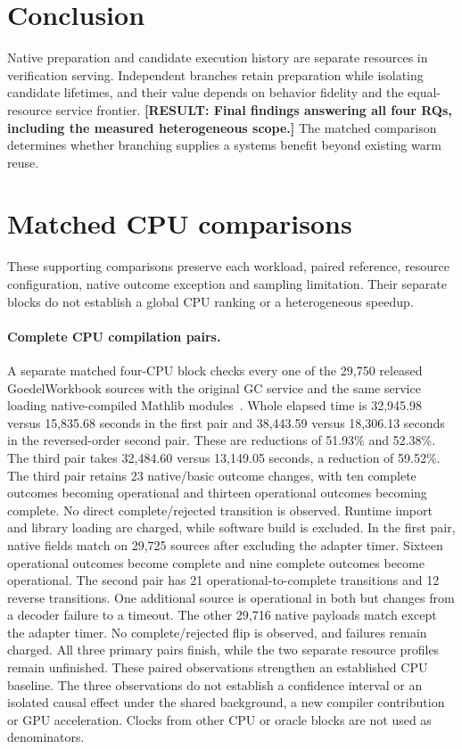 \documentclass[10pt,twocolumn]{article}
\newcommand{\missing}[1]{\textbf{[RESULT: #1]}}
\begin{document}
\section{Conclusion}
Native preparation and candidate execution history are separate resources in verification serving. Independent branches retain preparation while isolating candidate lifetimes, and their value depends on behavior fidelity and the equal-resource service frontier. \missing{Final findings answering all four RQs, including the measured heterogeneous scope.} The matched comparison determines whether branching supplies a systems benefit beyond existing warm reuse.




\appendix
\section{Matched CPU comparisons}\label{app:cpu-controls}
These supporting comparisons preserve each workload, paired reference, resource
configuration, native outcome exception and sampling limitation. Their separate
blocks do not establish a global CPU ranking or a heterogeneous speedup.

\paragraph{Complete CPU compilation pairs.}
A separate matched four-CPU block checks every one of the 29,750 released
GoedelWorkbook sources with the original GC service and the same service
loading native-compiled Mathlib modules~\cite{lean4}.
Whole elapsed time is 32,945.98 versus 15,835.68 seconds in the first pair
and 38,443.59 versus 18,306.13 seconds in the reversed-order second pair.
These are reductions of 51.93\% and 52.38\%.
The third pair takes 32,484.60 versus 13,149.05 seconds, a reduction of
59.52\%. The third pair retains 23 native/basic outcome changes, with ten complete outcomes
becoming operational and thirteen operational outcomes becoming complete.
No direct complete/rejected transition is observed.
Runtime import and library loading are charged, while software build is excluded.
In the first pair, native fields match on 29,725 sources after excluding the
adapter timer. Sixteen operational outcomes become complete and nine complete
outcomes become operational. The second pair has 21 operational-to-complete
transitions and 12 reverse transitions. One additional source is operational
in both but changes from a decoder failure to a timeout. The other 29,716
native payloads match except the adapter timer.
No complete/rejected flip is observed, and failures remain charged.
All three primary pairs finish, while the two separate resource profiles remain
unfinished. These paired observations strengthen an established CPU baseline.
The three observations do not establish a confidence interval or an isolated
causal effect under the shared background, a new compiler contribution or GPU acceleration.
Clocks from other CPU or oracle blocks are not used as denominators.
\end{document}
